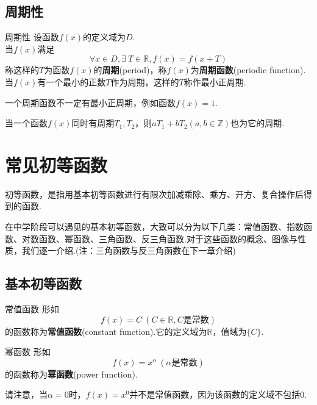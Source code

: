 \documentclass[lang=cn, zihao=5]{elegantbook}
\begin{document}
\subsection{周期性}

\begin{definition}{周期性} %
    设函数$f(x)$的定义域为$D$.\\
    当$f(x)$满足$$\forall x \in D, \exists \ T \in \mathbb{R}, f(x)=f(x+T)$$
    称这样的$T$为函数$f(x)$的\textbf{周期}(period)，称$f(x)$为\textbf{周期函数}(periodic function).当$f(x)$有一个最小的正数$T$作为周期，这样的$T$称作最小正周期.
\end{definition}

\begin{remark}
    一个周期函数不一定有最小正周期，例如函数$f(x)=1$.
\end{remark}
\begin{remark}
    当一个函数$f(x)$同时有周期$T_1,T_2$，则$aT_1+bT_2(a,b \in \mathbb{Z})$也为它的周期.
\end{remark}

\section{常见初等函数}

初等函数，是指用基本初等函数进行有限次加减乘除、乘方、开方、复合操作后得到的函数.

在中学阶段可以遇见的基本初等函数，大致可以分为以下几类：常值函数、指数函数、对数函数、幂函数、三角函数、反三角函数.对于这些函数的概念、图像与性质，我们逐一介绍.(注：三角函数与反三角函数在下一章介绍)

\subsection{基本初等函数}

\begin{definition}{常值函数}
    形如$$f(x)=C \ (C \in \mathbb{R}, C\textit{是常数})$$
    的函数称为\textbf{常值函数}(constant function).它的定义域为$\mathbb{R}$，值域为$\{ C \}$.
\end{definition}

\begin{definition}{幂函数}
    形如$$f(x)=x^{\alpha} \ (\alpha \text{是常数})$$
    的函数称为\textbf{幂函数}(power function).
\end{definition}
\begin{remark}
	请注意，当$\alpha =0$时，$f(x)=x^0$并不是常值函数，因为该函数的定义域不包括$0$.
\end{remark}
\end{document}
